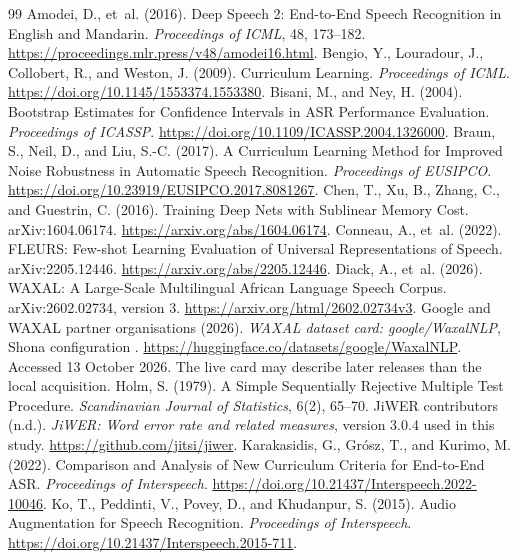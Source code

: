 \documentclass[12pt,a4paper]{report}
\newcommand{\code}[1]{\texttt{\detokenize{#1}}}
\begin{document}
\begin{thebibliography}{99}
 Amodei, D., et~al. (2016). Deep Speech 2: End-to-End Speech Recognition in English and Mandarin. \emph{Proceedings of ICML}, 48, 173--182. \url{https://proceedings.mlr.press/v48/amodei16.html}.
 Bengio, Y., Louradour, J., Collobert, R., and Weston, J. (2009). Curriculum Learning. \emph{Proceedings of ICML}. \url{https://doi.org/10.1145/1553374.1553380}.
 Bisani, M., and Ney, H. (2004). Bootstrap Estimates for Confidence Intervals in ASR Performance Evaluation. \emph{Proceedings of ICASSP}. \url{https://doi.org/10.1109/ICASSP.2004.1326000}.
 Braun, S., Neil, D., and Liu, S.-C. (2017). A Curriculum Learning Method for Improved Noise Robustness in Automatic Speech Recognition. \emph{Proceedings of EUSIPCO}. \url{https://doi.org/10.23919/EUSIPCO.2017.8081267}.
 Chen, T., Xu, B., Zhang, C., and Guestrin, C. (2016). Training Deep Nets with Sublinear Memory Cost. arXiv:1604.06174. \url{https://arxiv.org/abs/1604.06174}.
 Conneau, A., et~al. (2022). FLEURS: Few-shot Learning Evaluation of Universal Representations of Speech. arXiv:2205.12446. \url{https://arxiv.org/abs/2205.12446}.
 Diack, A., et~al. (2026). WAXAL: A Large-Scale Multilingual African Language Speech Corpus. arXiv:2602.02734, version 3. \url{https://arxiv.org/html/2602.02734v3}.
 Google and WAXAL partner organisations (2026). \emph{WAXAL dataset card: google/WaxalNLP}, Shona configuration \code{sna_asr}. \url{https://huggingface.co/datasets/google/WaxalNLP}. Accessed 13 October 2026. The live card may describe later releases than the local acquisition.
 Holm, S. (1979). A Simple Sequentially Rejective Multiple Test Procedure. \emph{Scandinavian Journal of Statistics}, 6(2), 65--70.
 JiWER contributors (n.d.). \emph{JiWER: Word error rate and related measures}, version 3.0.4 used in this study. \url{https://github.com/jitsi/jiwer}.
 Karakasidis, G., Gr\'osz, T., and Kurimo, M. (2022). Comparison and Analysis of New Curriculum Criteria for End-to-End ASR. \emph{Proceedings of Interspeech}. \url{https://doi.org/10.21437/Interspeech.2022-10046}.
 Ko, T., Peddinti, V., Povey, D., and Khudanpur, S. (2015). Audio Augmentation for Speech Recognition. \emph{Proceedings of Interspeech}. \url{https://doi.org/10.21437/Interspeech.2015-711}.

\end{thebibliography}
\end{document}
